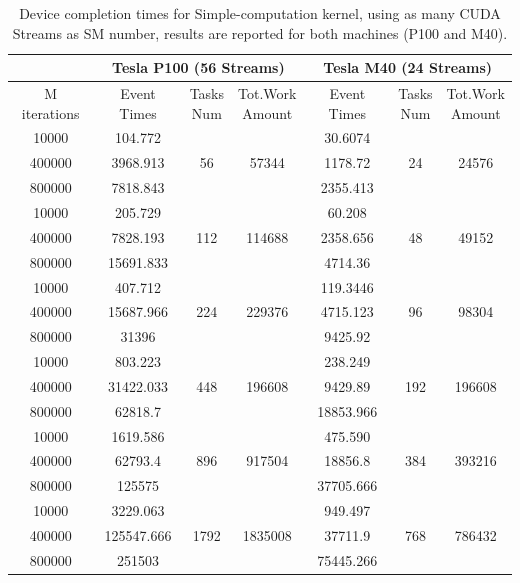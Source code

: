 \begin{table}	
	\centering
	\begin{tabular}{ | c |  c | c c  || c | c c | } 
		\hline
		& \multicolumn{3}{c||}{\textbf{Tesla P100 (56 Streams)}} & \multicolumn{3}{c|}{\textbf{Tesla M40 (24 Streams)}}\\ [0.5ex]
		\hline
		M iterations & Event Times & \makecell{Tasks \\ Num} & \makecell{Tot.Work \\ Amount}    &    Event Times & \makecell{Tasks \\ Num} & \makecell{Tot.Work \\ Amount}  \\
		\hline\hline
		
		10000 &	104.772& \multirow{3}{*}{56}& \multirow{3}{*}{57344}& 30.6074 & \multirow{3}{*}{24}& \multirow{3}{*}{24576}\\
		400000&	3968.913& &	&	1178.72	& &\\
		800000&	7818.843& &	&	2355.413& &	\\
		\hline
		10000&	205.729& \multirow{3}{*}{112}&\multirow{3}{*}{114688}& 60.208& \multirow{3}{*}{48}& \multirow{3}{*}{49152}\\
		400000&	7828.193&	&	&	2358.656&	&\\
		800000&	15691.833&	&	&	4714.36&	&	\\
		\hline
		10000&	407.712 & \multirow{3}{*}{224}& \multirow{3}{*}{229376}& 119.3446 & \multirow{3}{*}{96}&	\multirow{3}{*}{98304}\\
		400000&	15687.966&	&	&	4715.123&	&\\
		800000&	31396&	&	&	9425.92&	&	\\
		\hline
		10000&	803.223 & \multirow{3}{*}{448}& \multirow{3}{*}{196608}& 238.249 & \multirow{3}{*}{192}& \multirow{3}{*}{196608}\\
		400000&	31422.033&	&	&	9429.89&	&	\\
		800000&	62818.7&	&	&	18853.966&	&	\\
		\hline
		10000&	1619.586 & \multirow{3}{*}{896}& \multirow{3}{*}{917504}&	475.590& \multirow{3}{*}{384}&	\multirow{3}{*}{393216}\\
		400000&	62793.4&	&	&	18856.8&	&	\\
		800000&	125575&	&	&	37705.666&	&	\\
		\hline
		10000&	3229.063& \multirow{3}{*}{1792}& \multirow{3}{*}{1835008}&	949.497 & \multirow{3}{*}{768} & \multirow{3}{*}{786432}\\
		400000&	125547.666&	&	&	37711.9 &	&	\\
		800000&	251503&	&	&	75445.266&	&	\\
		
		\hline
	\end{tabular}
	\caption{Device completion times for Simple-computation kernel, using as many CUDA Streams as SM number, results are reported for both machines (P100 and M40).}	
	\label{tab:cosavgsSM}		
\end{table}

